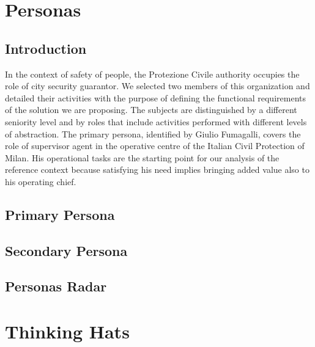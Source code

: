 \documentclass[../main.tex]{subfiles}
\begin{document}
    \chapter{Personas}\label{ch:topic}


    \section{Introduction}\label{sec:introduction}
    In the context of safety of people, the Protezione Civile authority occupies the role of city security guarantor.
    We selected two members of this organization and detailed their activities with the purpose of defining the functional requirements of the solution we are proposing.
    The subjects are distinguished by a different seniority level and by roles that include activities performed with different levels of abstraction.
    The primary persona, identified by Giulio Fumagalli, covers the role of supervisor agent in the operative centre of the Italian Civil Protection of Milan.
    His operational tasks are the starting point for our analysis of the reference context because satisfying his need implies bringing added value also to his operating chief.


    \section{Primary Persona}\label{sec:primary-persona}


    \section{Secondary Persona}\label{sec:secondary-persona}


    \section{Personas Radar}\label{sec:personas-radar}


    \chapter{Thinking Hats}\label{ch:thinking-hats}
\end{document}
